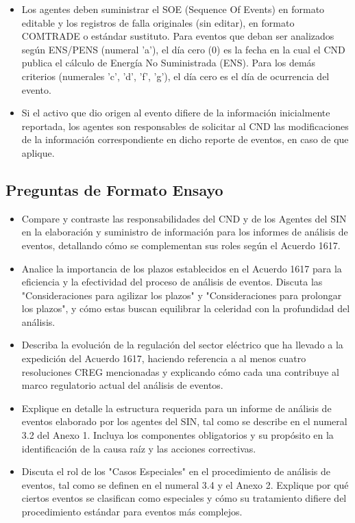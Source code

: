 \documentclass[a5paper]{book}%
\begin{document}
\begin{itemize}
  \item Los agentes deben suministrar el SOE (Sequence Of Events) en formato editable y los registros de falla originales (sin editar), en formato COMTRADE o estándar sustituto.
    Para eventos que deban ser analizados según ENS/PENS (numeral 'a'), el día cero (0) es la fecha en la cual el CND publica el cálculo de Energía No Suministrada (ENS). Para los demás criterios (numerales 'c', 'd', 'f', 'g'), el día cero es el día de ocurrencia del evento.
  \item Si el activo que dio origen al evento difiere de la información inicialmente reportada, los agentes son responsables de solicitar al CND las modificaciones de la información correspondiente en dicho reporte de eventos, en caso de que aplique.
    \end{itemize}

\subsection{Preguntas de Formato Ensayo}
\begin{itemize}
\item Compare y contraste las responsabilidades del CND y de los Agentes del SIN en la elaboración y suministro de información para los informes de análisis de eventos, detallando cómo se complementan sus roles según el Acuerdo 1617.
   
\item  Analice la importancia de los plazos establecidos en el Acuerdo 1617 para la eficiencia y la efectividad del proceso de análisis de eventos. Discuta las "Consideraciones para agilizar los plazos" y "Consideraciones para prolongar los plazos", y cómo estas buscan equilibrar la celeridad con la profundidad del análisis.
    
\item Describa la evolución de la regulación del sector eléctrico que ha llevado a la expedición del Acuerdo 1617, haciendo referencia a al menos cuatro resoluciones CREG mencionadas y explicando cómo cada una contribuye al marco regulatorio actual del análisis de eventos.
\item Explique en detalle la estructura requerida para un informe de análisis de eventos elaborado por los agentes del SIN, tal como se describe en el numeral 3.2 del Anexo 1. Incluya los componentes obligatorios y su propósito en la identificación de la causa raíz y las acciones correctivas.
\item Discuta el rol de los "Casos Especiales" en el procedimiento de análisis de eventos, tal como se definen en el numeral 3.4 y el Anexo 2. Explique por qué ciertos eventos se clasifican como especiales y cómo su tratamiento difiere del procedimiento estándar para eventos más complejos.
\end{itemize}
\end{document}
